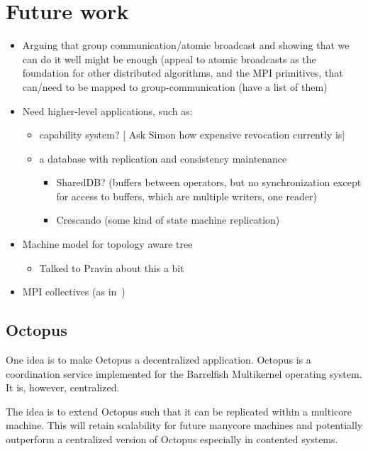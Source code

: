 \documentclass{article}
\newcommand{\stefan}[1]{
  {\color{skRed}[{\color{red}{SK}} #1]}}
\begin{document}
\section{Future work}

\begin{itemize}
\item Arguing that group communication/atomic broadcast and showing
  that we can do it well might be enough (appeal to atomic broadcasts
  as the foundation for other distributed algorithms, and the MPI
  primitives, that can/need to be mapped to group-communication (have
  a list of them) 
\item Need higher-level applications, such as:
  \begin{itemize}
  \item capability system? \stefan{Ask Simon how expensive revocation
      currently is}
  \item a database with replication and consistency maintenance
    \begin{itemize}
    \item SharedDB? (buffers between operators, but no synchronization
      except for access to buffers, which are multiple writers, one
      reader)
    \item Crescando (some kind of state machine replication)
    \end{itemize}
  \end{itemize}
\item Machine model for topology aware tree
  \begin{itemize}
  \item Talked to Pravin about this a bit
  \end{itemize}
\item MPI collectives (as in~\cite{Tu2008})
\end{itemize}

\subsection{Octopus}

One idea is to make Octopus a decentralized application. Octopus is
a coordination service implemented for the Barrelfish Multikernel
operating system. It is, however, centralized. 

The idea is to extend Octopus such that it can be replicated within a
multicore machine. This will retain scalability for future manycore
machines and potentially outperform a centralized version of Octopus
especially in contented systems.
\end{document}
